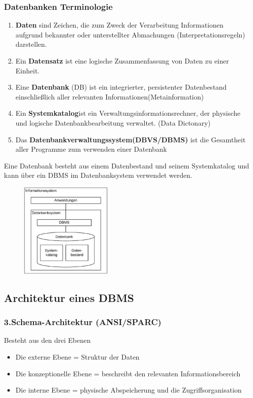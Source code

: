 \documentclass[a4paper,10pt]{scrartcl}
\begin{document}
\subsubsection{Datenbanken Terminologie}
\begin{enumerate}
    \item \textbf{Daten} sind Zeichen, die zum Zweck der Verarbeitung Informationen aufgrund bekannter oder unterstellter Abmachungen (Interpretationsregeln) darstellen.
    \item Ein \textbf{Datensatz} ist eine logische Zusammenfassung von Daten zu einer Einheit.
    \item Eine \textbf{Datenbank} (DB) ist ein integrierter, persistenter Datenbestand einschließlich aller relevanten Informationen(Metainformation)
    \item Ein \textbf{Systemkatalog}ist ein Verwaltungsinformationsrechner, der physische und logische Datenbankbearbeitung verwaltet. (Data Dictonary)
    \item Das \textbf{Datenbankverwaltungssystem(DBVS/DBMS)} ist die Gesamtheit aller Programme zum verwenden einer Datenbank
\end{enumerate}
Eine Datenbank besteht aus einem Datenbestand und seinem Systemkatalog und kann über ein DBMS im Datenbanksystem verwendet werden.
\begin{figure}[h]
	\centering
	\includegraphics[width = 0.4\textwidth]{Grundaufbau.PNG}
	\label{img:grafik-dummy}
\end{figure}

\subsection{Architektur eines DBMS}
\subsubsection{3.Schema-Architektur (ANSI/SPARC)}
Besteht aus den drei Ebenen
\begin{itemize}
    \item Die externe Ebene = Struktur der Daten
    \item Die konzeptionelle Ebene = beschreibt den relevanten Informationsbereich
    \item Die interne Ebene = physische Abspeicherung und die Zugriffsorganisation
\end{itemize}
\end{document}
